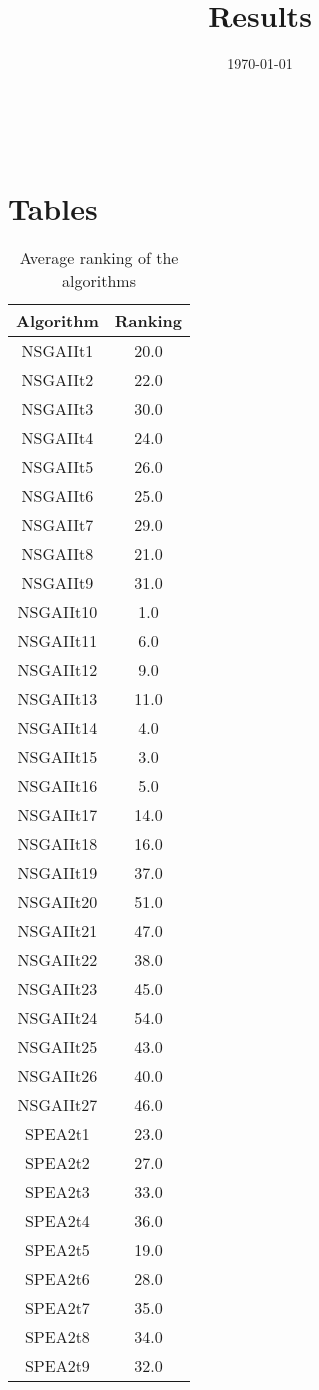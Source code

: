 \documentclass{article}
\title{Results}
\author{}
\date{\today}
\begin{document}
\oddsidemargin 0in \topmargin 0in\maketitle
\
\section{Tables}
\begin{table}[!htp]
\centering
\caption{Average ranking of the algorithms}
\begin{tabular}{c|c}
Algorithm&Ranking\\
\hline
NSGAIIt1&20.0\\
NSGAIIt2&22.0\\
NSGAIIt3&30.0\\
NSGAIIt4&24.0\\
NSGAIIt5&26.0\\
NSGAIIt6&25.0\\
NSGAIIt7&29.0\\
NSGAIIt8&21.0\\
NSGAIIt9&31.0\\
NSGAIIt10&1.0\\
NSGAIIt11&6.0\\
NSGAIIt12&9.0\\
NSGAIIt13&11.0\\
NSGAIIt14&4.0\\
NSGAIIt15&3.0\\
NSGAIIt16&5.0\\
NSGAIIt17&14.0\\
NSGAIIt18&16.0\\
NSGAIIt19&37.0\\
NSGAIIt20&51.0\\
NSGAIIt21&47.0\\
NSGAIIt22&38.0\\
NSGAIIt23&45.0\\
NSGAIIt24&54.0\\
NSGAIIt25&43.0\\
NSGAIIt26&40.0\\
NSGAIIt27&46.0\\
SPEA2t1&23.0\\
SPEA2t2&27.0\\
SPEA2t3&33.0\\
SPEA2t4&36.0\\
SPEA2t5&19.0\\
SPEA2t6&28.0\\
SPEA2t7&35.0\\
SPEA2t8&34.0\\
SPEA2t9&32.0\\

\end{tabular}
\end{table}
\end{document}
